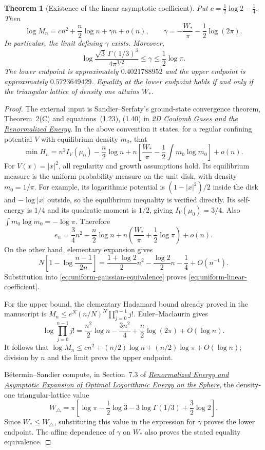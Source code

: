 \documentclass[11pt]{article}
\newtheorem{theorem}{Theorem}[section]
\theoremstyle{remark}
\numberwithin{equation}{section}
\begin{document}
\begin{theorem}[Existence of the linear asymptotic coefficient]
\label{thm:uniform-linear-coefficient}
Put $c=\tfrac12\log2-\tfrac14$. Then
\begin{equation}\label{eq:uniform-linear-coefficient}
 \boxed{\displaystyle
 \log M_n=cn^2+\frac n2\log n+\gamma n+o(n),\qquad
 \gamma=-\frac{W_*}{\pi}-\frac12\log(2\pi).}
\end{equation}
In particular, the limit defining $\gamma$ exists. Moreover,
\begin{equation}\label{eq:uniform-linear-coefficient-bounds}
 \log\frac{\sqrt3\,\Gamma(1/3)^3}{4\pi^{3/2}}
 \le\gamma\le\frac12\log\pi.
\end{equation}
The lower endpoint is approximately $0.4021788952$ and the upper
endpoint is approximately $0.5723649429$. Equality at the lower endpoint
holds if and only if the triangular lattice of density one attains $W_*$.
\end{theorem}
\begin{proof}
The external input is Sandier--Serfaty's ground-state convergence
theorem, Theorem~2(C) and equations~(1.23), (1.40) in
\href{https://arxiv.org/pdf/1201.3503}{\emph{2D Coulomb Gases and the
Renormalized Energy}}. In the above convention it states, for a regular
confining potential $V$ with equilibrium density $m_0$, that
\[
 \min H_n=n^2I_V(\mu_0)-\frac n2\log n
 +n\left[\frac{W_*}{\pi}-\frac12\int m_0\log m_0\right]+o(n).
\]
For $V(x)=|x|^2$, all regularity and growth assumptions hold. Its
equilibrium measure is the uniform probability measure on the unit disk,
with density $m_0=1/\pi$. For example, its logarithmic potential is
$(1-|x|^2)/2$ inside the disk and $-\log|x|$ outside, so the equilibrium
inequality is verified directly. Its self-energy is $1/4$ and its
quadratic moment is $1/2$, giving $I_V(\mu_0)=3/4$. Also
$\int m_0\log m_0=-\log\pi$. Therefore
\[
 e_n=\frac34n^2-\frac n2\log n
 +n\left(\frac{W_*}{\pi}+\frac12\log\pi\right)+o(n).
\]
On the other hand, elementary expansion gives
\[
 N\left[1-\log\frac{n-1}{2n}\right]
 =\frac{1+\log2}{2}n^2-\frac{\log2}{2}n-\frac14+O(n^{-1}).
\]
Substitution into \eqref{eq:uniform-gaussian-equivalence} proves
\eqref{eq:uniform-linear-coefficient}.

For the upper bound, the elementary Hadamard bound already proved in
the manuscript is
$M_n\le e^N(n/N)^N\prod_{j=0}^{n-1}j!$. Euler--Maclaurin gives
\[
 \log\prod_{j=0}^{n-1}j!
 =\frac{n^2}{2}\log n-\frac{3n^2}{4}
 +\frac n2\log(2\pi)+O(\log n).
\]
It follows that $\log M_n\le cn^2+(n/2)\log n+
(n/2)\log\pi+O(\log n)$; division by $n$ and the limit prove the
upper endpoint.

B\'etermin--Sandier compute, in Section~7.3 of
\href{https://arxiv.org/pdf/1404.4485}{\emph{Renormalized Energy and
Asymptotic Expansion of Optimal Logarithmic Energy on the Sphere}},
the density-one triangular-lattice value
\[
 W_\triangle=\pi\left[\log\pi-\frac12\log3
 -3\log\Gamma(1/3)+\frac32\log2\right].
\]
Since $W_*\le W_\triangle$, substituting this value in the expression
for $\gamma$ proves the lower endpoint. The affine dependence of
$\gamma$ on $W_*$ also proves the stated equality equivalence.
\end{proof}
\end{document}

